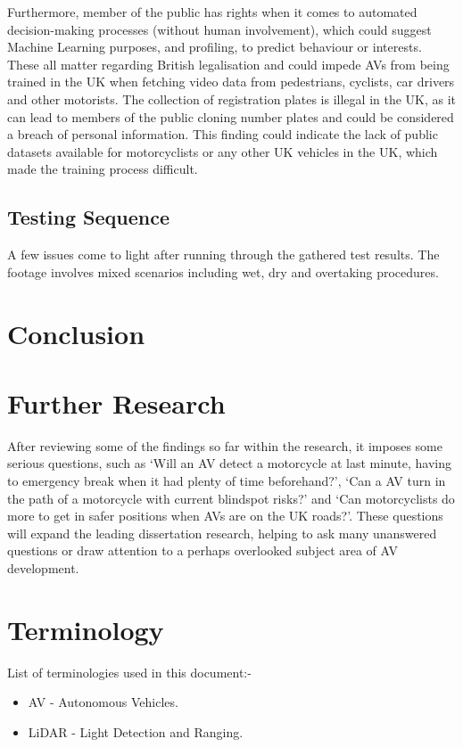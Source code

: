 \documentclass[conference]{IEEEtran}
\begin{document}
		Furthermore, member of the public has rights when it comes to automated decision-making processes (without human involvement), which could suggest Machine Learning purposes, and profiling, to predict behaviour or interests. These all matter regarding British legalisation and could impede AVs from being trained in the UK when fetching video data from pedestrians, cyclists, car drivers and other motorists. The collection of registration plates is illegal in the UK, as it can lead to members of the public cloning number plates and could be considered a breach of personal information. This finding could indicate the lack of public datasets available for motorcyclists or any other UK vehicles in the UK, which made the training process difficult.
	\subsection{Testing Sequence}
		A few issues come to light after running through the gathered test results. The footage involves mixed scenarios including wet, dry and overtaking procedures. 


\section{Conclusion}

\section{Further Research}
	After reviewing some of the findings so far within the research, it imposes some serious questions, such as `Will an AV detect a motorcycle at last minute, having to emergency break when it had plenty of time beforehand?', `Can a AV turn in the path of a motorcycle with current blindspot risks?' and `Can motorcyclists do more to get in safer positions when AVs are on the UK roads?'. These questions will expand the leading dissertation research, helping to ask many unanswered questions or draw attention to a perhaps overlooked subject area of AV development.

\section{Terminology}
	List of terminologies used in this document:-
	\begin{itemize}
		\item AV - Autonomous Vehicles.
		\item LiDAR - Light Detection and Ranging.
	\end{itemize}

\renewcommand\refname{\section{Reference List}}
\small{
	}
\end{document}

